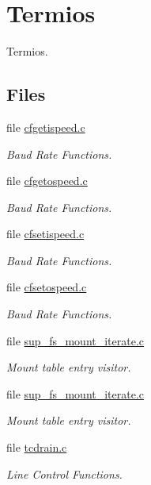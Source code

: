 \hypertarget{group__Termios}{}\section{Termios}
\label{group__Termios}


Termios.  


\subsection*{Files}
\begin{DoxyCompactItemize}
\item 
file \mbox{\hyperlink{cfgetispeed_8c}{cfgetispeed.\+c}}
\begin{DoxyCompactList}\small\item\em Baud Rate Functions. \end{DoxyCompactList}\item 
file \mbox{\hyperlink{cfgetospeed_8c}{cfgetospeed.\+c}}
\begin{DoxyCompactList}\small\item\em Baud Rate Functions. \end{DoxyCompactList}\item 
file \mbox{\hyperlink{cfsetispeed_8c}{cfsetispeed.\+c}}
\begin{DoxyCompactList}\small\item\em Baud Rate Functions. \end{DoxyCompactList}\item 
file \mbox{\hyperlink{cfsetospeed_8c}{cfsetospeed.\+c}}
\begin{DoxyCompactList}\small\item\em Baud Rate Functions. \end{DoxyCompactList}\item 
file \mbox{\hyperlink{sup__fs__mount__iterate_8c}{sup\+\_\+fs\+\_\+mount\+\_\+iterate.\+c}}
\begin{DoxyCompactList}\small\item\em Mount table entry visitor. \end{DoxyCompactList}\item 
file \mbox{\hyperlink{sup__fs__mount__iterate_8c}{sup\+\_\+fs\+\_\+mount\+\_\+iterate.\+c}}
\begin{DoxyCompactList}\small\item\em Mount table entry visitor. \end{DoxyCompactList}\item 
file \mbox{\hyperlink{tcdrain_8c}{tcdrain.\+c}}
\begin{DoxyCompactList}\small\item\em Line Control Functions. \end{DoxyCompactList}\item 

\end{DoxyCompactItemize}
